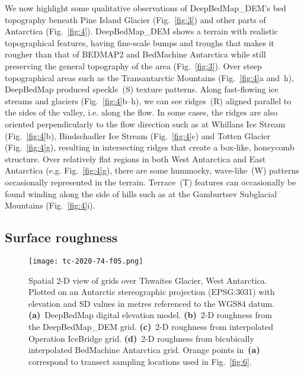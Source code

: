 \documentclass[tc, noline]{copernicus}
\begin{document}
We now highlight some qualitative observations of DeepBedMap\_DEM's bed topography beneath Pine Island Glacier (Fig.~\ref{fig:3}) and other parts of
Antarctica (Fig.~\ref{fig:4}). DeepBedMap\_DEM shows a terrain with realistic topographical features, having fine-scale bumps and troughs that makes
it rougher than that of BEDMAP2 \citep{FretwellBedmap2improvedice2013} and BedMachine Antarctica \citep{MorlighemMEaSUREsBedMachineAntarctica2019}
while still preserving the general topography of the area (Fig.~\ref{fig:3}). Over steep topographical areas such as the Transantarctic Mountains
(Fig.~\ref{fig:4}a and~h), DeepBedMap produced speckle~(S) texture patterns. Along fast-flowing ice streams and glaciers
(Fig.~\ref{fig:4}b--h), we can see ridges~(R) aligned parallel to the sides of the valley, i.e. along the flow. In some cases, the ridges are
also oriented perpendicularly to the flow direction such as at Whillans Ice Stream (Fig.~\ref{fig:4}b), Bindschadler Ice Stream (Fig.~\ref{fig:4}c) and
Totten Glacier (Fig.~\ref{fig:4}g), resulting in intersecting ridges that create a box-like, honeycomb structure. Over relatively flat regions in
both West Antarctica and East Antarctica (e.g. Fig.~\ref{fig:4}g), there are some hummocky, wave-like~(W) patterns occasionally represented in the
terrain. Terrace~(T) features can occasionally be found winding along the side of hills such as at the Gamburtsev Subglacial Mountains
(Fig.~\ref{fig:4}i).


\subsection{Surface roughness} \label{section:surfaceroughness}

\begin{figure*}[t]
\texttt{[image: tc-2020-74-f05.png]}
\caption{Spatial 2-D view of grids over Thwaites Glacier, West Antarctica. Plotted on an Antarctic stereographic projection (EPSG:3031) with elevation and SD values in metres referenced to the WGS84 datum. \textbf{(a)}~DeepBedMap digital elevation model. \textbf{(b)}~2-D roughness from the DeepBedMap\_DEM grid. \textbf{(c)}~2-D roughness from interpolated Operation IceBridge grid. \textbf{(d)}~2-D roughness from bicubically interpolated BedMachine Antarctica grid. Orange points in~\textbf{(a)} correspond to transect sampling locations used in Fig.~\ref{fig:6}.}
\label{fig:5}
\end{figure*}
\end{document}
